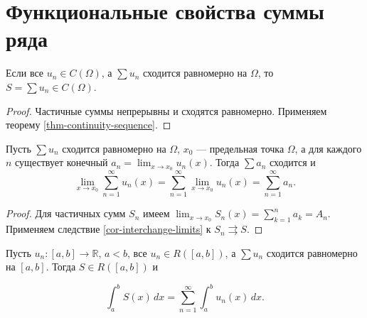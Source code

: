 \section{Функциональные свойства суммы ряда}\label{sec-series-04}

\begin{theorem}\label{thm-series-continuity}

Если все \(u_n\in C(\Omega)\), а \(\sum u_n\) сходится равномерно на \(\Omega\), то \(S=\sum u_n\in C(\Omega)\).

\end{theorem}

\begin{proof}

Частичные суммы непрерывны и сходятся равномерно. Применяем теорему \ref{thm-continuity-sequence}.

\end{proof}

\begin{cor}\label{cor-series-limit}

Пусть \(\sum u_n\) сходится равномерно на \(\Omega\), \(x_0\) --- предельная точка \(\Omega\), а для каждого \(n\) существует конечный \(a_n=\lim_{x\to x_0}u_n(x)\). Тогда \(\sum a_n\) сходится и \[
\lim_{x\to x_0}\sum_{n=1}^\infty u_n(x)
=\sum_{n=1}^\infty\lim_{x\to x_0}u_n(x)=\sum_{n=1}^\infty a_n.
\]

\end{cor}

\begin{proof}

Для частичных сумм \(S_n\) имеем \(\lim_{x\to x_0}S_n(x)=\sum_{k=1}^n a_k=A_n\). Применяем следствие \ref{cor-interchange-limits} к \(S_n\rightrightarrows S\).

\end{proof}

\begin{theorem}\label{thm-series-integral}

Пусть \(u_n:[a,b]\to\mathbb R\), \(a<b\), все \(u_n\in R([a,b])\), а \(\sum u_n\) сходится равномерно на \([a,b]\). Тогда \(S\in R([a,b])\) и

\begin{equation}
\int_a^b S(x)\,dx=\sum_{n=1}^\infty\int_a^b u_n(x)\,dx.
\label{eq-series-integral}
\end{equation}

\end{theorem}

